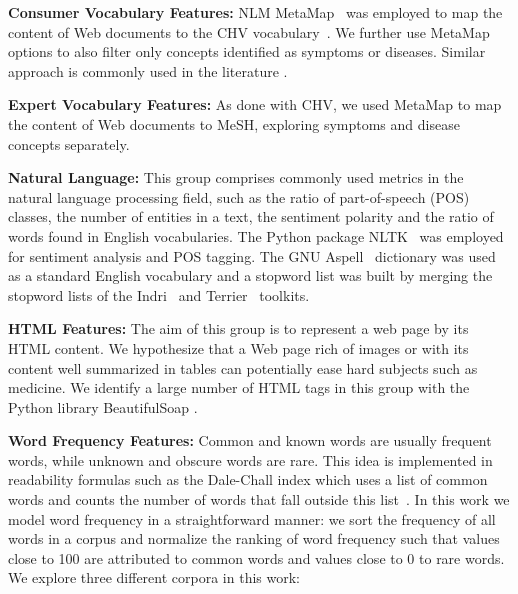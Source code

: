 \textbf{Consumer Vocabulary Features:}
NLM MetaMap~\cite{aronson10} was employed to map the content of Web documents to the CHV vocabulary~\cite{zeng06}.
We further use MetaMap options to also filter only concepts identified as symptoms or diseases.
Similar approach is commonly used in the literature \cite{} .

\textbf{Expert Vocabulary Features:}
As done with CHV, we used MetaMap to map the content of Web documents to MeSH, exploring symptoms and disease concepts separately. 

\textbf{Natural Language:}
This group comprises commonly used metrics in the natural language processing field, such as the ratio of part-of-speech (POS) classes, the number of entities in a text, the sentiment polarity and the ratio of words found in English vocabularies. The Python package NLTK~\cite{nltk} was employed for sentiment analysis and POS tagging. The GNU Aspell~\cite{aspell} dictionary was used as a standard English vocabulary and a stopword list was built by merging the stopword
lists of the Indri~\cite{indri} and Terrier~\cite{terrier} toolkits. 

\textbf{HTML Features:}
The aim of this group is to represent a web page by its HTML content.
We hypothesize that a Web page rich of images or with its content well summarized in tables can potentially ease hard subjects such as medicine. 
We identify a large number of HTML tags in this group with the Python library BeautifulSoap \cite{bs4}.

\textbf{Word Frequency Features:}
Common and known words are usually frequent words, while unknown and obscure words are rare. This idea is implemented in readability formulas such as the Dale-Chall index which uses a list of common words and counts the number of words that fall outside this list~\cite{dale48}.
In this work we model word frequency in a straightforward manner: we sort the frequency of all words in a corpus and normalize the ranking of word frequency such that values close to 100 are attributed to common words and values close to 0 to rare words. 
We explore three different corpora in this work:

